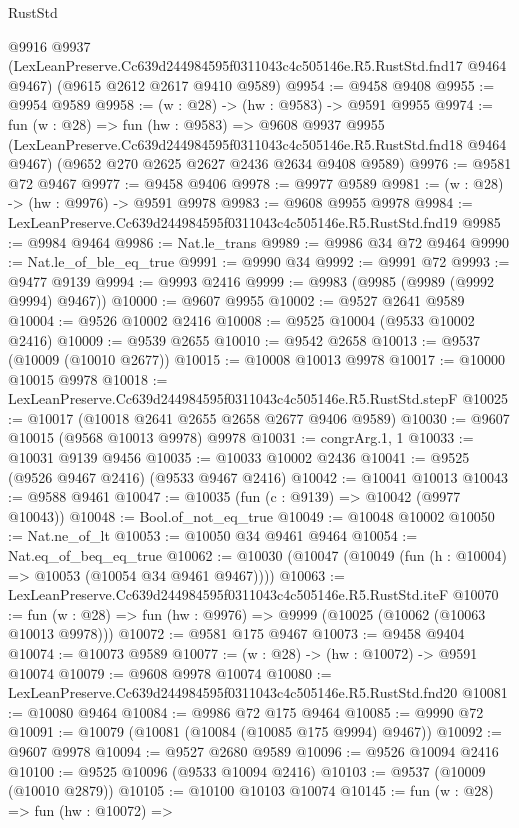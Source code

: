 \begin{lexlean}{RustStd}
\begin{coremodule}
    @9916
    @9937
    (LexLeanPreserve.Cc639d244984595f0311043c4c505146e.R5.RustStd.fnd17 @9464 @9467)
    (@9615 @2612 @2617 @9410 @9589)
@9954 := @9458 @9408
@9955 := @9954 @9589
@9958 := (w : @28) -> (hw : @9583) -> @9591 @9955
@9974 := fun (w : @28) =>
  fun (hw : @9583) =>
  @9608
    @9937
    @9955
    (LexLeanPreserve.Cc639d244984595f0311043c4c505146e.R5.RustStd.fnd18 @9464 @9467)
    (@9652 @270 @2625 @2627 @2436 @2634 @9408 @9589)
@9976 := @9581 @72 @9467
@9977 := @9458 @9406
@9978 := @9977 @9589
@9981 := (w : @28) -> (hw : @9976) -> @9591 @9978
@9983 := @9608 @9955 @9978
@9984 := LexLeanPreserve.Cc639d244984595f0311043c4c505146e.R5.RustStd.fnd19
@9985 := @9984 @9464
@9986 := Nat.le_trans
@9989 := @9986 @34 @72 @9464
@9990 := Nat.le_of_ble_eq_true
@9991 := @9990 @34
@9992 := @9991 @72
@9993 := @9477 @9139
@9994 := @9993 @2416
@9999 := @9983 (@9985 (@9989 (@9992 @9994) @9467))
@10000 := @9607 @9955
@10002 := @9527 @2641 @9589
@10004 := @9526 @10002 @2416
@10008 := @9525 @10004 (@9533 @10002 @2416)
@10009 := @9539 @2655
@10010 := @9542 @2658
@10013 := @9537 (@10009 (@10010 @2677))
@10015 := @10008 @10013 @9978
@10017 := @10000 @10015 @9978
@10018 := LexLeanPreserve.Cc639d244984595f0311043c4c505146e.R5.RustStd.stepF
@10025 := @10017 (@10018 @2641 @2655 @2658 @2677 @9406 @9589)
@10030 := @9607 @10015 (@9568 @10013 @9978) @9978
@10031 := congrArg.{1, 1}
@10033 := @10031 @9139 @9456
@10035 := @10033 @10002 @2436
@10041 := @9525 (@9526 @9467 @2416) (@9533 @9467 @2416)
@10042 := @10041 @10013
@10043 := @9588 @9461
@10047 := @10035 (fun (c : @9139) => @10042 (@9977 @10043))
@10048 := Bool.of_not_eq_true
@10049 := @10048 @10002
@10050 := Nat.ne_of_lt
@10053 := @10050 @34 @9461 @9464
@10054 := Nat.eq_of_beq_eq_true
@10062 := @10030 (@10047 (@10049 (fun (h : @10004) => @10053 (@10054 @34 @9461 @9467))))
@10063 := LexLeanPreserve.Cc639d244984595f0311043c4c505146e.R5.RustStd.iteF
@10070 := fun (w : @28) => fun (hw : @9976) => @9999 (@10025 (@10062 (@10063 @10013 @9978)))
@10072 := @9581 @175 @9467
@10073 := @9458 @9404
@10074 := @10073 @9589
@10077 := (w : @28) -> (hw : @10072) -> @9591 @10074
@10079 := @9608 @9978 @10074
@10080 := LexLeanPreserve.Cc639d244984595f0311043c4c505146e.R5.RustStd.fnd20
@10081 := @10080 @9464
@10084 := @9986 @72 @175 @9464
@10085 := @9990 @72
@10091 := @10079 (@10081 (@10084 (@10085 @175 @9994) @9467))
@10092 := @9607 @9978
@10094 := @9527 @2680 @9589
@10096 := @9526 @10094 @2416
@10100 := @9525 @10096 (@9533 @10094 @2416)
@10103 := @9537 (@10009 (@10010 @2879))
@10105 := @10100 @10103 @10074
@10145 := fun (w : @28) =>
  fun (hw : @10072) =>

\end{coremodule}
\end{lexlean}

